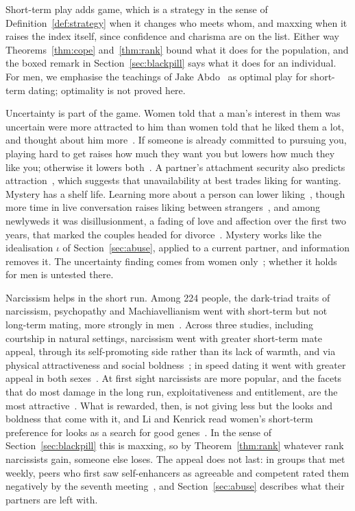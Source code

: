 \documentclass[11pt]{article}
\theoremstyle{definition}
\theoremstyle{remark}
\begin{document}
Short-term play adds game, which is a strategy in the sense of
Definition~\ref{def:strategy} when it changes who meets whom, and
maxxing when it raises the index itself, since confidence and charisma
are on the list. Either way Theorems~\ref{thm:cope} and~\ref{thm:rank}
bound what it does for the population, and the boxed remark in
Section~\ref{sec:blackpill} says what it does for an individual. For
men, we emphasise the teachings of Jake Abdo~\cite{abdo} as
optimal play for short-term dating; optimality is not proved here.

Uncertainty is part of the game. Women told that a man's interest in them
was uncertain were more attracted to him than women told that he liked
them a lot, and thought about him more~\cite{whitchurch}. If someone is
already committed to pursuing you, playing hard to get raises how much
they want you but lowers how much they like you; otherwise it lowers
both~\cite{dai}. A partner's attachment security also predicts
attraction~\cite{klohnen}, which suggests that unavailability at best
trades liking for wanting. Mystery has a shelf life. Learning more about
a person can lower liking~\cite{norton}, though more time in live
conversation raises liking between strangers~\cite{reis}, and among
newlyweds it was disillusionment, a fading of love and affection over the
first two years, that marked the couples headed for divorce~\cite{huston}.
Mystery works like the idealisation $\iota$ of Section~\ref{sec:abuse},
applied to a current partner, and information removes it. The
uncertainty finding comes from women only~\cite{whitchurch}; whether it
holds for men is untested there.

Narcissism helps in the short run. Among 224 people, the dark-triad
traits of narcissism, psychopathy and Machiavellianism went with
short-term but not long-term mating, more strongly in
men~\cite{jonason}. Across three studies, including courtship in natural
settings, narcissism went with greater short-term mate appeal, through
its self-promoting side rather than its lack of warmth, and via physical
attractiveness and social boldness~\cite{dufner}; in speed dating it went
with greater appeal in both sexes~\cite{jauk}. At first sight narcissists
are more popular, and the facets that do most damage in the long run,
exploitativeness and entitlement, are the most attractive~\cite{back}.
What is rewarded, then, is not giving less but the looks and boldness
that come with it, and Li and Kenrick read women's short-term preference
for looks as a search for good genes~\cite{li2006}. In the sense of
Section~\ref{sec:blackpill} this is maxxing, so by
Theorem~\ref{thm:rank} whatever rank narcissists gain, someone else
loses. The appeal does not last: in groups that met weekly, peers who
first saw self-enhancers as agreeable and competent rated them negatively
by the seventh meeting~\cite{paulhus}, and Section~\ref{sec:abuse}
describes what their partners are left with.
\end{document}
